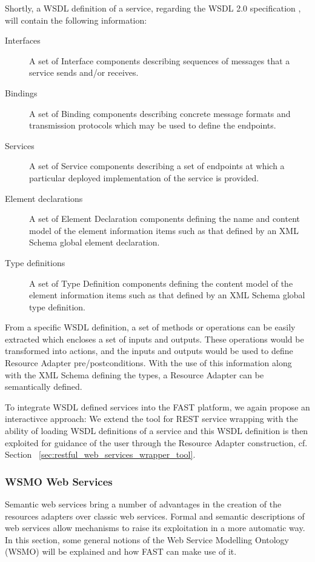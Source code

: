 \documentclass{article}
\begin{document}
Shortly, a WSDL definition of a service, regarding the WSDL 2.0 specification \cite{WSDL2.0}, will contain the following information:
\begin{description}
	\item[Interfaces] A set of Interface components describing sequences of messages that a service sends and/or receives.
	\item[Bindings] A set of Binding components describing concrete message formats and transmission protocols which may be used to define the endpoints.
	\item[Services] A set of Service components describing a set of endpoints at which a particular deployed implementation of the service is provided.
	\item[Element declarations] A set of Element Declaration components defining the name and content model of the element information items such as that defined by an XML Schema global element declaration.
	\item[Type definitions] A set of Type Definition components defining the content model of the element information items such as that defined by an XML Schema global type definition.
\end{description}

From a specific WSDL definition, a set of methods or operations can be easily extracted which encloses a set of inputs and outputs. These operations would be transformed into actions, and the inputs and outputs would be used to define Resource Adapter pre/postconditions. With the use of this information along with the XML Schema defining the types, a Resource Adapter can be semantically defined.

To integrate WSDL defined services into the FAST platform, we again propose an interactivce approach: We extend the tool for REST service wrapping with the ability of loading WSDL definitions of a service and this WSDL definition is then exploited for guidance of the user through the Resource Adapter construction, cf. Section ~\ref{sec:restful_web_services_wrapper_tool}.


\subsubsection{WSMO Web Services} %
\label{ssub:wsmo_web_services}

Semantic web services bring a number of advantages in the creation of the resources adapters over classic web services. Formal and semantic descriptions of web services allow mechanisms to raise its exploitation in a more automatic way. In this section, some general notions of the Web Service Modelling Ontology (WSMO) will be explained and how FAST can make use of it.
\end{document}
